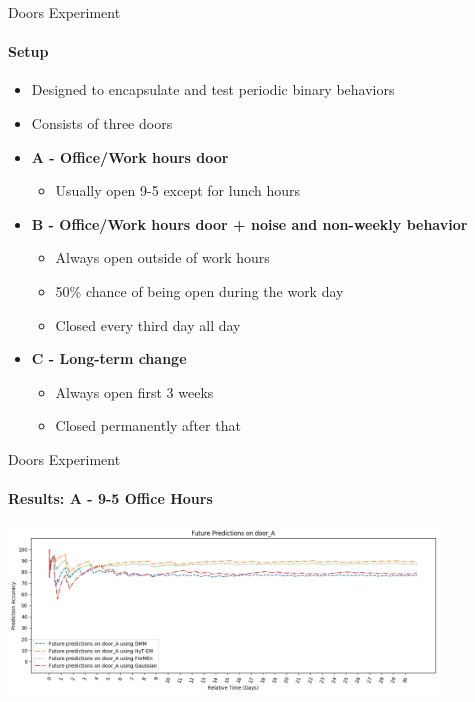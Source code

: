 \documentclass{beamer}
\begin{document}
\begin{frame}[t]{Doors Experiment}
  \framesubtitle{Setup}
  \begin{itemize}
    \item Designed to encapsulate and test periodic binary behaviors
    \item Consists of three doors
    \setlength\itemsep{1em}
  \item \textbf{A - Office/Work hours door}
    \begin{itemize}
      \item Usually open 9-5 except for lunch hours
    \end{itemize}
  \item \textbf{B - Office/Work hours door + noise and non-weekly behavior}
    \begin{itemize}
      \item Always open outside of work hours
      \item 50\% chance of being open during the work day
      \item Closed every third day all day
    \end{itemize}
  \item \textbf{C - Long-term change}
    \begin{itemize}
      \item Always open first 3 weeks
      \item Closed permanently after that
    \end{itemize}
  \end{itemize}
\end{frame}

\begin{frame}[t]{Doors Experiment}
  \framesubtitle{Results: A - 9-5 Office Hours}

  {\includegraphics[width = 4.5in]{images/results/Future_Predictions_on_door_A.png}}

  \begin{table}[h!]
    \centering
  \end{table}

\end{frame}
\end{document}
